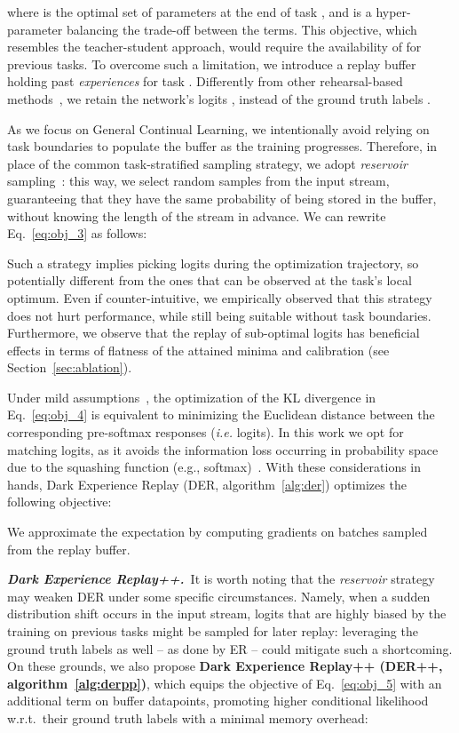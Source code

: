 \documentclass{article}
\begin{document}
where  is the optimal set of parameters at the end of task , and  is a hyper-parameter balancing the trade-off between the terms. This objective, which resembles the teacher-student approach, would require the availability of  for previous tasks. To overcome such a limitation, we introduce a replay buffer  holding past \textit{experiences} for task . Differently from other rehearsal-based methods~\cite{aljundi2019gradient, chaudhry2020using, riemer2018learning}, we retain the network's logits , instead of the ground truth labels .

As we focus on General Continual Learning, we intentionally avoid relying on task boundaries to populate the buffer as the training progresses. Therefore, in place of the common task-stratified sampling strategy, we adopt \textit{reservoir} sampling~\cite{vitter1985random}: this way, we select  random samples from the input stream, guaranteeing that they have the same probability  of being stored in the buffer, without knowing the length of the stream  in advance. We can rewrite Eq.~\ref{eq:obj_3} as follows:

Such a strategy implies picking logits  during the optimization trajectory, so potentially different from the ones that can be observed at the task's local optimum.
Even if counter-intuitive, we empirically observed that this strategy does not hurt performance, while still being suitable without task boundaries. Furthermore, we observe that the replay of sub-optimal logits has beneficial effects in terms of flatness of the attained minima and calibration (see Section~\ref{sec:ablation}). 


Under mild assumptions~\cite{hinton2015distilling}, the optimization of the KL divergence in Eq.~\ref{eq:obj_4} is equivalent to minimizing the Euclidean distance between the corresponding pre-softmax responses (\textit{i.e.} logits). In this work we opt for matching logits, as it avoids the information loss occurring in probability space due to the squashing function (e.g., softmax)~\cite{liu2018improving}. With these considerations in hands, Dark Experience Replay (DER, algorithm~\ref{alg:der}) optimizes the following objective:

We approximate the expectation by computing gradients on batches sampled from the replay buffer.

\textbf{\textit{Dark Experience Replay++.}}~It is worth noting that the \textit{reservoir} strategy may weaken DER under some specific circumstances. Namely, when a sudden distribution shift occurs in the input stream, logits that are highly biased by the training on previous tasks might be sampled for later replay: leveraging the ground truth labels as well -- as done by ER -- could mitigate such a shortcoming. On these grounds, we also propose \textbf{Dark Experience Replay++ (DER++, algorithm~\ref{alg:derpp})}, which equips the objective of Eq.~\ref{eq:obj_5} with an additional term on buffer datapoints, promoting higher conditional likelihood w.r.t.\ their ground truth labels with a minimal memory overhead:
\end{document}
